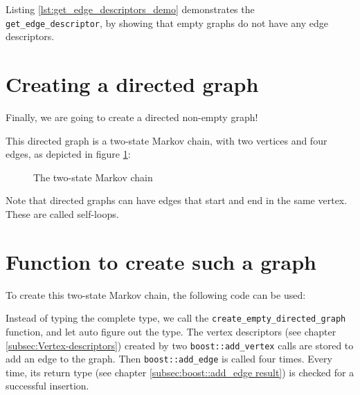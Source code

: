 Listing \ref{lst:get_edge_descriptors_demo}
demonstrates the \verb;get_edge_descriptor;, by showing that empty graphs do
not have any edge descriptors.



\section{Creating a directed graph}
\label{subsec:create_markov_chain_graph}

Finally, we are going to create a directed non-empty graph! 

This directed graph is a two-state Markov chain, with two vertices and four
edges, as depicted in figure \ref{fig:markov_chain}:

\begin{figure}
  \caption{The two-state Markov chain}
  \label{fig:markov_chain}
\end{figure}

Note that directed graphs can have edges that start and end in the same
vertex.
These are called self-loops.

\section{Function to create such a graph}

To create this two-state Markov chain, the following code can be used:



Instead of typing the complete type, 
we call the \verb;create_empty_directed_graph;
function, and let auto figure out the type.
The vertex descriptors (see chapter \ref{subsec:Vertex-descriptors}) 
created by two \verb;boost::add_vertex; 
calls are stored to add an edge to the graph.
Then \verb;boost::add_edge; 
is called four times.
Every time, its return type 
(see chapter \ref{subsec:boost::add_edge result}) 
is checked for a successful insertion.

